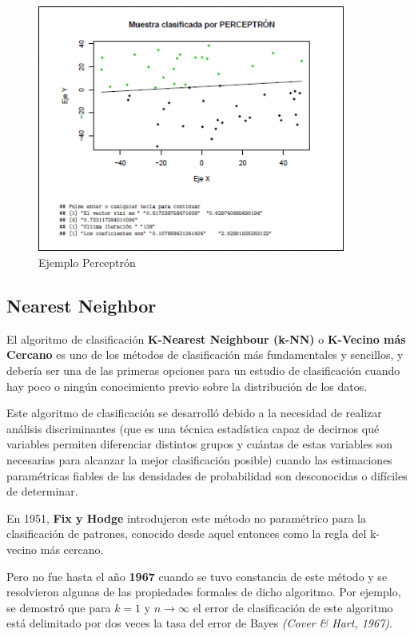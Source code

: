 \documentclass[a4paper, 11pt]{article} %
\begin{document}
\begin{figure}[H]
\centering
\includegraphics[width=0.9\textwidth]{ejemploPerceptron.PNG}
\caption{Ejemplo Perceptrón}
\label{Ejemplo Perceptron}
\end{figure}

\subsection{Nearest Neighbor}
El algoritmo de clasificación \textbf{K-Nearest Neighbour (k-NN)} o \textbf{K-Vecino más Cercano} es uno de los métodos de clasificación más fundamentales y sencillos, y debería ser una de las primeras opciones para un estudio de clasificación cuando hay poco o ningún conocimiento previo sobre la distribución de los datos.

Este algoritmo de clasificación se desarrolló debido a la necesidad de realizar análisis discriminantes (que es una técnica estadística capaz de decirnos qué variables permiten diferenciar distintos grupos y cuántas de estas variables son necesarias para alcanzar la mejor clasificación posible) cuando las estimaciones paramétricas fiables de las densidades de probabilidad son desconocidas o difíciles de determinar.

En 1951, \textbf{Fix y Hodge} introdujeron este método no paramétrico para la clasificación de patrones, conocido desde aquel entonces como la regla del k-vecino más cercano.

Pero no fue hasta el año \textbf{1967} cuando se tuvo constancia de este método y se resolvieron algunas de las propiedades formales de dicho algoritmo. Por ejemplo, se demostró que para $k = 1$ y $n \rightarrow \infty$ el error de clasificación de este algoritmo está delimitado por dos veces la tasa del error de Bayes \textit{(Cover \& Hart, 1967)}.
\end{document}
